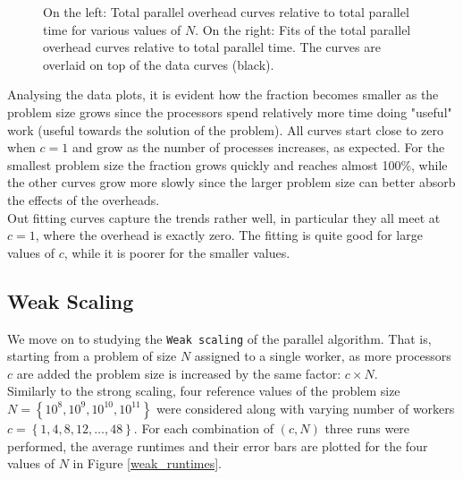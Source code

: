 \documentclass{article}
\begin{document}
\begin{figure}[H]
\begin{subfigure}[h]{0.5\textwidth}
    \caption{}
    \label{overhead_fit}
  \end{subfigure}
   \caption{On the left: Total parallel overhead curves relative to total parallel time for various values of $N$. On the right: Fits of the total parallel overhead curves relative to total parallel time.  The curves are overlaid on top of the data curves (black).}
   \label{overhead_figs}
\end{figure}

Analysing the data plots, it is evident how the fraction becomes smaller as the problem size grows since the processors spend relatively more time doing "useful" work (useful towards the solution of the problem). All curves start close to zero when $c=1$ and grow as the number of processes increases, as expected. For the smallest problem size the fraction grows quickly and reaches almost 100\%, while the other curves grow more slowly since the larger problem size can better absorb the effects of the overheads.\\
Out fitting curves capture the trends rather well, in particular they all meet at $c=1$, where the overhead is exactly zero. The fitting is quite good for large values of $c$, while it is poorer for the smaller values.

\subsection{Weak Scaling}

We move on to studying the \texttt{Weak scaling} of the parallel algorithm. That is, starting from a problem of size $N$ assigned to a single worker, as more processors $c$ are added the problem size is increased by the same factor: $c \times N$.\\
Similarly to the strong scaling, four reference values of the problem size $N=\left\{ 10^{8}, 10^{9}, 10^{10}, 10^{11} \right\}$ were considered along with varying number of workers $c=\left\{ 1, 4, 8, 12, \dots , 48 \right\}$.
For each combination of $\left(c,N\right)$ three runs were performed, the average runtimes and their error bars are plotted for the four values of $N$ in Figure \ref{weak_runtimes}.
\end{document}
